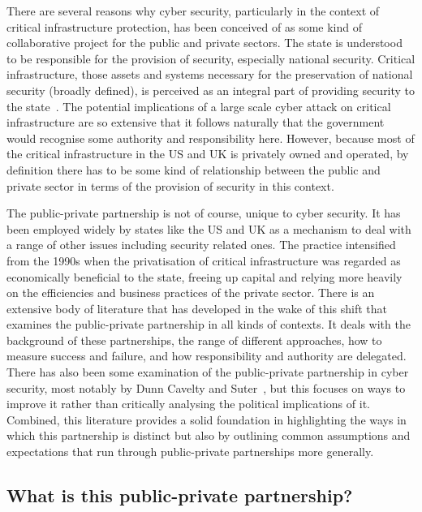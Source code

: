 \documentclass[a4paper,11pt]{article}
\begin{document}
There are several reasons why cyber security, particularly in the
context of critical infrastructure protection, has been conceived of
as some kind of collaborative project for the public and private
sectors. The state is understood to be responsible for the provision
of security, especially national security. Critical infrastructure,
those assets and systems necessary for the preservation of national
security (broadly defined), is perceived as an integral part of
providing security to the state~\cite{choucri-et-al:2014}. The
potential implications of a large scale cyber attack on critical
infrastructure are so extensive that it follows naturally that the
government would recognise some authority and responsibility
here. However, because most of the critical infrastructure in the US
and UK is privately owned and operated, by definition there has to be
some kind of relationship between the public and private sector in
terms of the provision of security in this context.

The public-private partnership is not of course, unique to cyber
security. It has been employed widely by states like the US and UK as
a mechanism to deal with a range of other issues including security
related ones. The practice intensified from the 1990s when the
privatisation of critical infrastructure was regarded as economically
beneficial to the state, freeing up capital and relying more heavily
on the efficiencies and business practices of the private
sector. There is an extensive body of literature that has developed in
the wake of this shift that examines the public-private partnership in
all kinds of contexts. It deals with the background of these
partnerships, the range of different approaches, how to measure
success and failure, and how responsibility and authority are
delegated. There has also been some examination of the public-private
partnership in cyber security, most notably by Dunn Cavelty and
Suter~\cite{dunncavelty+suter:2009}, but this focuses on ways to
improve it rather than critically analysing the political implications
of it. Combined, this literature provides a solid foundation in
highlighting the ways in which this partnership is distinct but also
by outlining common assumptions and expectations that run through
public-private partnerships more generally.

\subsection{What is this public-private partnership?}
\end{document}
